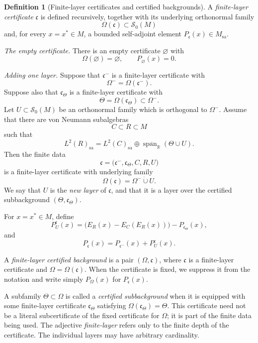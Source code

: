 \documentclass[11pt,letterpaper,reqno]{amsart}
\theoremstyle{definition}
\newtheorem{defin}[thm]{Definition}
\numberwithin{equation}{section}
\newcommand{\sa}{\mathrm{sa}}
\newcommand{\RR}{\mathbb R}
\DeclareMathOperator{\spanop}{span}
\begin{document}
\begin{defin}[Finite-layer certificates and certified backgrounds]\label{def:certified}
A \emph{finite-layer certificate} $\mathfrak c$ is defined recursively,
together with its underlying orthonormal family
\[
   \Omega(\mathfrak c)\subset\mathcal S_0(M)
\]
and, for every $x=x^*\in M$, a bounded self-adjoint element
$P_{\mathfrak c}(x)\in M_{\sa}$.

\smallskip

\noindent\emph{The empty certificate.}
There is an empty certificate $\varnothing$ with
\[
   \Omega(\varnothing)=\varnothing,
   \qquad
   P_{\varnothing}(x)=0 .
\]

\smallskip

\noindent\emph{Adding one layer.}
Suppose that $\mathfrak c^-$ is a finite-layer certificate with
\[
   \Omega^-=\Omega(\mathfrak c^-).
\]
Suppose also that $\mathfrak c_\Theta$ is a finite-layer certificate with
\[
   \Theta=\Omega(\mathfrak c_\Theta)\subset\Omega^- .
\]
Let $U\subset\mathcal S_0(M)$ be an orthonormal family which is orthogonal to
$\Omega^-$.  Assume that there are von Neumann subalgebras
\[
   C\subset R\subset M
\]
such that
\[
   L^2(R)_{\sa}
   =
   L^2(C)_{\sa}\oplus
   \overline{\spanop_{\RR}}(\Theta\cup U).
\]
Then the finite data
\[
   \mathfrak c=
   \bigl(\mathfrak c^-,\mathfrak c_\Theta,C,R,U\bigr)
\]
is a finite-layer certificate with underlying family
\[
   \Omega(\mathfrak c)=\Omega^-\dot\cup U.
\]
We say that $U$ is the \emph{new layer} of $\mathfrak c$, and that it is a
layer over the certified subbackground $(\Theta,\mathfrak c_\Theta)$.

For $x=x^*\in M$, define
\[
   P_U^{\mathfrak c}(x)
   =
   \bigl(E_R(x)-E_C(E_R(x))\bigr)-P_{\mathfrak c_\Theta}(x),
\]
and
\[
   P_{\mathfrak c}(x)
   =
   P_{\mathfrak c^-}(x)+P_U^{\mathfrak c}(x).
\]

A \emph{finite-layer certified background} is a pair
$(\Omega,\mathfrak c)$, where $\mathfrak c$ is a finite-layer certificate and
$\Omega=\Omega(\mathfrak c)$.  When the certificate is fixed, we suppress it
from the notation and write simply $P_\Omega(x)$ for $P_{\mathfrak c}(x)$.

A subfamily $\Theta\subset\Omega$ is called a \emph{certified subbackground}
when it is equipped with some finite-layer certificate
$\mathfrak c_\Theta$ satisfying $\Omega(\mathfrak c_\Theta)=\Theta$.
This certificate need not be a literal subcertificate of the fixed certificate
for $\Omega$; it is part of the finite data being used.  The adjective
\emph{finite-layer} refers only to the finite depth of the certificate.  The
individual layers may have arbitrary cardinality.
\end{defin}
\end{document}
